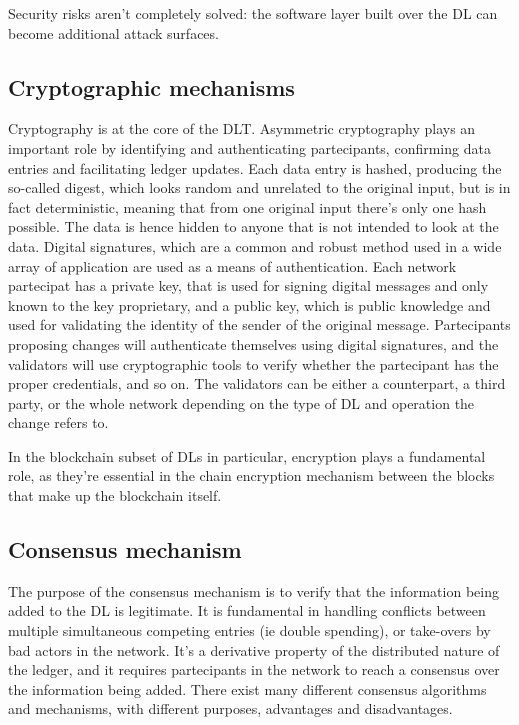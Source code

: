 Security risks aren't completely solved: the software layer built over the DL can become additional attack surfaces.

\subsection{Cryptographic mechanisms}

Cryptography is at the core of the DLT. Asymmetric cryptography plays an important role by identifying and authenticating partecipants, confirming data entries and facilitating ledger updates.
Each data entry is hashed, producing the so-called digest, which looks random and unrelated to the original input, but is in fact deterministic, meaning that from one original input there's only one hash possible. The data is hence hidden to anyone that is not intended to look at the data. Digital signatures, which are a common and robust method used in a wide array of application are used as a means of authentication. Each network partecipat has a private key, that is used for signing digital messages and only known to the key proprietary, and a public key, which is public knowledge and used for validating the identity of the sender of the original message.
Partecipants proposing changes will authenticate themselves using digital signatures, and the validators will use cryptographic tools to verify whether the partecipant has the proper credentials, and so on. The validators can be either a counterpart, a third party, or the whole network depending on the type of DL and operation the change refers to.

In the blockchain subset of DLs in particular, encryption plays a fundamental role, as they're essential in the chain encryption mechanism between the blocks that make up the blockchain itself.


\subsection{Consensus mechanism}
\label{sec:consensus}
The purpose of the consensus mechanism is to verify that the information being added to the DL is legitimate. It is fundamental in handling conflicts between multiple simultaneous competing entries (ie double spending), or take-overs by bad actors in the network. It's a derivative property of the distributed nature of the ledger, and it requires partecipants in the network to reach a consensus over the information being added. There exist many different consensus algorithms and mechanisms, with different purposes, advantages and disadvantages. \\

